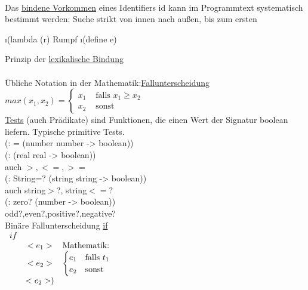 \linie\\
Das \underline{bindene Vorkommen} eines Identifiers id kann im Programmtext systematisch bestimmt werden: Suche strikt von innen nach au\ss en, bis zum ersten
\begin{enumerate}[(1)]
\i (lambda (r) \auf Rumpf\zu
\i (define \auf e\zu)
\end{enumerate}
Prinzip der \underline{lexikalische Bindung}\\
\linie\\
\"Ubliche Notation in der Mathematik:\underline{Fallunterscheidung}\\
$max(x_1,x_2) =
\begin{cases}
x_1 &\text{ falls } x_1 \geq x_2\\
x_2 &\text{ sonst } 
\end{cases}$\\
\underline{Tests} (auch Pr\"adikate) sind Funktionen, die einen Wert der Signatur boolean liefern. Typische primitive Tests.\\
(: = (number number -> boolean))\\
(: \auf (real real -> boolean))\\
auch $>,<=,>=$\\
(: String=? (string string -> boolean))\\
auch string$>$?, string$<=?$\\
(: zero? (number -> boolean))\\
odd?,even?,positive?,negative?\\
Bin\"are Fallunterscheidung \underline{if}\\
$\begin{array}{lcl}
if\\
& <e_1>& \text{Mathematik:}\\
& <e_2>& \begin{cases}e_1& \text{falls } t_1\\
					  e_2& \text{sonst}
\end{cases}\\
& <e_2>)
\end{array}$



